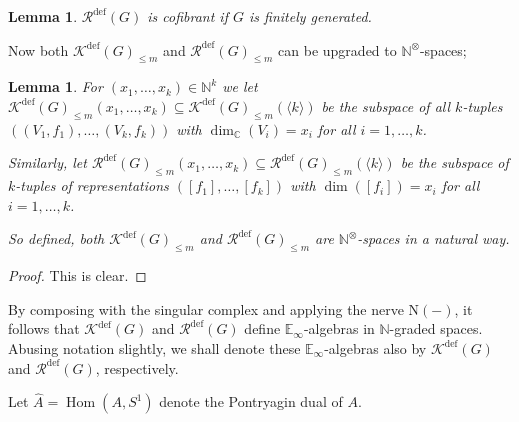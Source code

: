 \documentclass[oneside, a4paper, 12pt]{article}
\numberwithin{equation}{section}
\DeclareMathOperator{\Hom}{Hom}
\newcommand{\Kdef}{\mathcal{K}^{\mathrm{def}}}
\newcommand{\Rdef}{\mathcal{R}^{\mathrm{def}}}
\newcommand{\C}{\mathbb{C}}
\newcommand{\N}{\mathbb{N}}
\theoremstyle{plain}
\newtheorem{lemma}[theorem]{Lemma}
\theoremstyle{definition}
\theoremstyle{remark}
\begin{document}
\begin{lemma}
$\Rdef(G)$ is cofibrant if $G$ is finitely generated.
\end{lemma}


Now both $\Kdef(G)_{\leq m}$ and $\Rdef(G)_{\leq m}$ can be upgraded to $\N^\otimes$-spaces;

\begin{lemma}
For $(x_1,\dots,x_k)\in \N^k$ we let $\Kdef(G)_{\leq m}(x_1,\dots,x_k) \subseteq \Kdef(G)_{\leq m}(\langle k\rangle)$ be the subspace of all $k$-tuples $((V_1,f_1),\dots,(V_k,f_k))$ with $\dim_{\C}(V_i)=x_i$ for all $i=1,\dots,k$.

Similarly, let $\Rdef(G)_{\leq m}(x_1,\dots,x_k)\subseteq \Rdef(G)_{\leq m}(\langle k\rangle)$ be the subspace of $k$-tuples of representations $([f_1],\dots,[f_k])$ with $\dim([f_i])=x_i$ for all $i=1,\dots,k$.

So defined, both $\Kdef(G)_{\leq m}$ and $\Rdef(G)_{\leq m}$ are $\N^\otimes$-spaces in a natural way.
\end{lemma}
\begin{proof}
This is clear.
\end{proof}

By composing with the singular complex and applying the nerve $\mathrm{N}(-)$, it follows that $\Kdef(G)$ and $\Rdef(G)$ define $\mathbb{E}_\infty$-algebras in $\N$-graded spaces. Abusing notation slightly, we shall denote these $\mathbb{E}_\infty$-algebras also by $\Kdef(G)$ and $\Rdef(G)$, respectively.

Let $\widehat{A}=\Hom(A,S^1)$ denote the Pontryagin dual of $A$.
\end{document}
